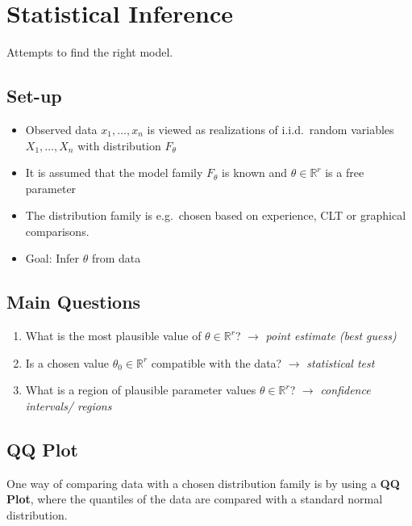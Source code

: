 \section{Statistical Inference}
Attempts to find the right model.
\subsection{Set-up}
\begin{itemize}
    \item Observed data $x_1,\ldots, x_n$ is viewed as realizations of i.i.d.\ random variables $X_1,\ldots, X_n$ with distribution $F_\theta$
    \item It is assumed that the model family $F_\theta$ is known and $\theta\in \mathbb{R}^r$ is a free parameter
    \item The distribution family is e.g.\ chosen based on experience, CLT or graphical comparisons.
    \item Goal: Infer $\theta$ from data
\end{itemize}

\subsection{Main Questions}
\begin{enumerate}
    \item What is the most plausible value of  $\theta\in \mathbb{R}^r$?\newline
          $\to$ \textit{point estimate (best guess)}
    \item Is a chosen value  $\theta_0\in \mathbb{R}^r$ compatible with the data?\newline
          $\to$ \textit{statistical test}
    \item What is a region of plausible parameter values  $\theta\in \mathbb{R}^r$?\newline
          $\to$ \textit{confidence intervals/ regions}
\end{enumerate}

\subsection{QQ Plot}
One way of comparing data with a chosen distribution family is by using a \textbf{QQ Plot},
where the quantiles of the data are compared with a standard normal distribution.


